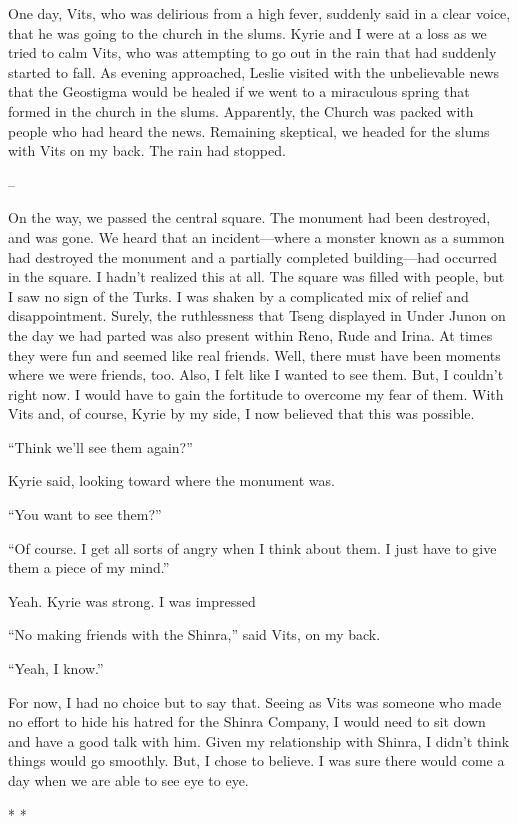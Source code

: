 \documentclass[oneside]{book}
\begin{document}
One day, Vits, who was delirious from a high fever, suddenly said in a clear voice, that he was going to the church in the slums. Kyrie and I were at a loss as we tried to calm Vits, who was attempting to go out in the rain that had suddenly started to fall. As evening approached, Leslie visited with the unbelievable news that the Geostigma would be healed if we went to a miraculous spring that formed in the church in the slums. Apparently, the Church was packed with people who had heard the news. Remaining skeptical, we headed for the slums with Vits on my back. The rain had stopped.

–

On the way, we passed the central square. The monument had been destroyed, and was gone. We heard that an incident—where a monster known as a summon had destroyed the monument and a partially completed building—had occurred in the square. I hadn’t realized this at all. The square was filled with people, but I saw no sign of the Turks. I was shaken by a complicated mix of relief and disappointment. Surely, the ruthlessness that Tseng displayed in Under Junon on the day we had parted was also present within Reno, Rude and Irina. At times they were fun and seemed like real friends. Well, there must have been moments where we were friends, too. Also, I felt like I wanted to see them. But, I couldn’t right now. I would have to gain the fortitude to overcome my fear of them. With Vits and, of course, Kyrie by my side, I now believed that this was possible.

“Think we’ll see them again?”

Kyrie said, looking toward where the monument was.

“You want to see them?”

“Of course. I get all sorts of angry when I think about them. I just have to give them a piece of my mind.”

Yeah. Kyrie was strong. I was impressed

“No making friends with the Shinra,” said Vits, on my back.

“Yeah, I know.”

For now, I had no choice but to say that. Seeing as Vits was someone who made no effort to hide his hatred for the Shinra Company, I would need to sit down and have a good talk with him. Given my relationship with Shinra, I didn’t think things would go smoothly. But, I chose to believe. I was sure there would come a day when we are able to see eye to eye.

* *
\end{document}
